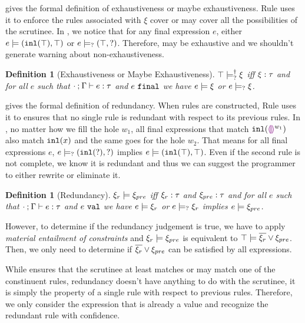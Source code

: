 \documentclass[acmsmall,screen,review,nonacm]{acmart}
\theoremstyle{slplain}
\numberwithin{thm}{section}
\newtheorem{defn}[thm]{Definition}
\begin{document}
 gives the formal definition of exhaustiveness or maybe exhaustiveness.
Rule \TMatchZPre uses it to enforce the rules associated with $\xi$ cover or may cover all the possibilities of the scrutinee.
In , we notice that for any final expression $e$, either 
$e \models (\mathtt{inl}(\top) , \top)$ or $e \models_{?} (\top , \mathtt{?})$.
Therefore,  may be exhaustive and we shouldn't generate warning about non-exhaustiveness.

\begin{defn}[Exhaustiveness or Maybe Exhaustiveness]
  \label{defn:exhaustiveness}
  $\top \models_{?}^{\dag} \xi$ iff $\xi : \tau$ and for all $e$ such that $\cdot \mathbin{;} \Gamma \vdash e : \tau$ and $e ~\mathtt{final}$ we have $e \models \xi$ or $e \models_{?} \xi$.
\end{defn}

 gives the formal definition of redundancy. When rules are constructed, Rule \TRules uses it to ensures that no single rule is redundant with respect to its previous rules.
In , no matter how we fill the hole $w_1$, all final expressions that match $\mathtt{inl}(\textcolor{violet}{\llparenthesis}\textcolor{violet}{\rrparenthesis}^{w_1})$ also match $\mathtt{inl}(x)$ and the same goes for the hole $w_2$.
That means for all final expressions $e$,
$e \models_{?} (\mathtt{inl}(\mathtt{?}) , \mathtt{?})$ implies $e \models (\mathtt{inl}(\top) , \top)$.
Even if the second rule is not complete, we know it is redundant and thus we can suggest the programmer to either rewrite or eliminate it.

\begin{defn}[Redundancy]
  \label{defn:redundancy}
  $\xi_r \models \xi_{pre}$ iff $\xi_r : \tau$ and $\xi_{pre} : \tau$ and for all $e$ such that $\cdot \mathbin{;} \Gamma \vdash e : \tau$ and $e ~\mathtt{val}$ we have $e \models \xi_r$ or $e \models_{?} \xi_r$ implies $e \models \xi_{pre}$.
\end{defn}

However, to determine if the redundancy judgement is true, we have to apply \emph{material entailment of constraints} and $\xi_r \models \xi_{pre}$ is equivalent to $\top \models \overline{\xi_r} \vee \xi_{pre}$. Then, we only need to determine if $\overline{\xi_r} \vee \xi_{pre}$ can be satisfied by all expressions.

While  ensures that the scrutinee at least matches or may match one of the constinuent rules, redundancy doesn't have anything to do with the scrutinee, it is simply the property of a single rule with respect to previous rules. Therefore, we only consider the expression that is already a value and recognize the redundant rule with confidence.
\end{document}
